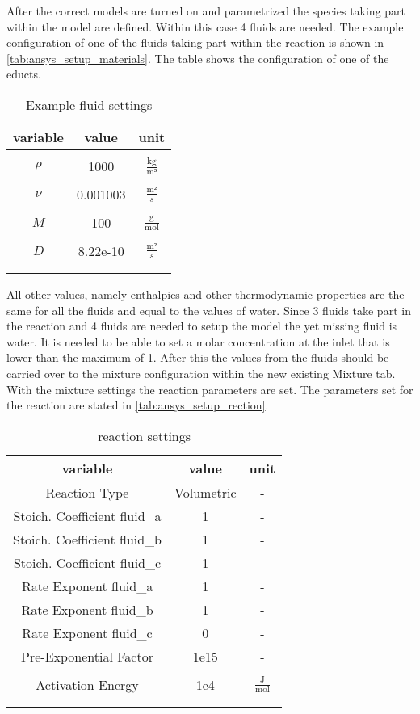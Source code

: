 \documentclass[../thesis.tex]{subfiles}
\begin{document}
After the correct models are turned on and parametrized the species taking part within the model are defined. Within this case 4 fluids are needed. The example configuration of one of the fluids taking part within the reaction is shown in \autoref{tab:ansys_setup_materials}. The table shows the configuration of one of the educts.
\begin{table} [htb]
	\centering
	\caption{Example fluid settings}
	\begin{tabular}{ ccc }
		\hline
		variable & value & unit \\
		\hline
		\\[-1em]
		$\rho$ & 1000 & $\frac{\text{kg}}{\text{m³}}$ \\
		\\[-1em]
		$\nu$ & 0.001003 & $\frac{\text{m²}}{s}$ \\
		\\[-1em]
		$M$ & 100 & $\frac{\text{g}}{\text{mol}}$ \\
		\\[-1em]
		$D$ & 8.22e-10 & $\frac{\text{m²}}{s}$\\
		\\[-1em]
		\hline
		\label{tab:ansys_setup_materials}
	\end{tabular}
\end{table}
All other values, namely enthalpies and other thermodynamic properties are the same for all the fluids and equal to the values of water. Since 3 fluids take part in the reaction and 4 fluids are needed to setup the model the yet missing fluid is water. It is needed to be able to set a molar concentration at the inlet that is lower than the maximum of 1. After this the values from the fluids should be carried over to the mixture configuration within the new existing Mixture tab. With the mixture settings the reaction parameters are set. The parameters set for the reaction are stated in \autoref{tab:ansys_setup_rection}.
\begin{table} [htb]
	\centering
	\caption{reaction settings}
	\begin{tabular}{ ccc }
		\hline
		variable & value & unit \\
		\hline
		Reaction Type & Volumetric & - \\
		Stoich. Coefficient fluid\_a & 1 & - \\
		Stoich. Coefficient fluid\_b & 1 & - \\
		Stoich. Coefficient fluid\_c & 1 & - \\
		Rate Exponent fluid\_a & 1 & - \\
		Rate Exponent fluid\_b & 1 & - \\
		Rate Exponent fluid\_c & 0 & - \\
		Pre-Exponential Factor & 1e15 & - \\
		\\[-1em]
		Activation Energy & 1e4 & $\frac{\text{J}}{\text{mol}}$ \\
		\\[-1em]
		\hline
		\label{tab:ansys_setup_rection}
	\end{tabular}
\end{table}
\end{document}
